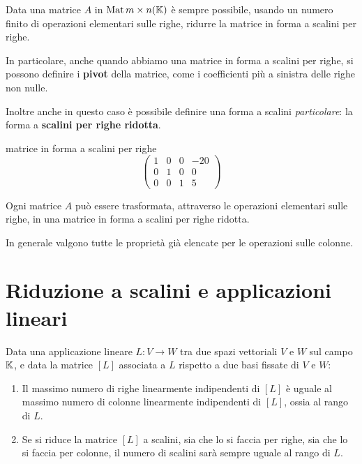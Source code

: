 \begin{theorem}
	Data una matrice $A$ in $\operatorname{Mat}{m \times n}(\mathbb{K})$ è sempre possibile,
	usando un numero finito di operazioni elementari sulle righe, ridurre la
	matrice in forma a scalini per righe.
\end{theorem}

In particolare, anche quando abbiamo una matrice in forma a scalini per righe, si
possono definire i \textbf{pivot} della matrice, come i coefficienti più a
sinistra delle righe non nulle.

Inoltre anche in questo caso è possibile definire una forma a scalini
\emph{particolare}: la forma a \textbf{scalini per righe ridotta}.

\begin{example}
	matrice in forma a scalini per righe
	\[
		\begin{pmatrix}
			1 & 0 & 0 & -20 \\
			0 & 1 & 0 & 0   \\
			0 & 0 & 1 & 5
		\end{pmatrix}
	\]
\end{example}

\begin{corollary}
	Ogni matrice $A$ può essere trasformata, attraverso le operazioni elementari
	sulle righe, in una matrice in forma a scalini per righe ridotta.
\end{corollary}

In generale valgono tutte le proprietà già elencate per le operazioni sulle
colonne.

\section{Riduzione a scalini e applicazioni lineari}

\begin{theorem}
	Data una applicazione lineare $L : V \to W$ tra due spazi vettoriali $V$ e
	$W$ sul campo $\mathbb{K}$, e data la matrice $[L]$ associata a $L$ rispetto
	a due basi fissate di $V$ e $W$:
	\begin{enumerate}
		\item Il massimo numero di righe linearmente indipendenti di $[L]$ è
		      uguale al massimo numero di colonne linearmente indipendenti di
		      $[L]$, ossia al rango di $L$.
		\item Se si riduce la matrice $[L]$ a scalini, sia che lo si faccia
		      per righe, sia che lo si faccia per colonne, il numero di scalini
		      sarà sempre uguale al rango di $L$.
	\end{enumerate}
\end{theorem}

